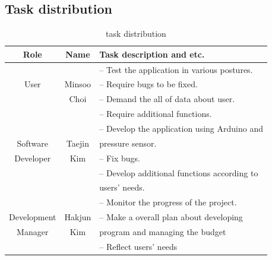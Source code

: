 \documentclass[conference]{IEEEtran}
\begin{document}
\subsection{Task distribution}

\renewcommand{\arrayrulewidth}{1pt}


\begin{table}[H]
\caption{task distribution}
\begin{tabular}{|c|c|l|}\hline
Role & Name & Task description and etc.\\ \hline \hline

&  &  -- Test the application in various postures. \\ 

User & Minsoo & -- Require bugs to be fixed.  \\ 

& Choi & -- Demand the all of data about user. \\ 

&  & -- Require additional functions. \\ \hline

&  &  -- Develop the application using Arduino and\\ 

Software & Taejin & pressure sensor. \\ 

Developer & Kim & -- Fix bugs. \\ 

&  & -- Develop additional functions according to\\ 

&  & users' needs. \\ \hline

&  &  -- Monitor the progress of the project. \\ 

Development & Hakjun & -- Make a overall plan about developing \\ 

Manager& Kim & program and managing the budget \\ 

&  & -- Reflect users' needs \\ \hline

\end{tabular}\\\\\\\\

\end{table}
\end{document}
